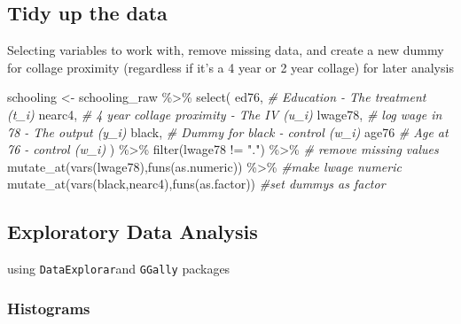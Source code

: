 \documentclass[
]{article}
\newenvironment{Shaded}{\begin{snugshade}}{\end{snugshade}}
\newcommand{\CommentTok}[1]{\textcolor[rgb]{0.56,0.35,0.01}{\textit{#1}}}
\newcommand{\FunctionTok}[1]{\textcolor[rgb]{0.00,0.00,0.00}{#1}}
\newcommand{\NormalTok}[1]{#1}
\newcommand{\OtherTok}[1]{\textcolor[rgb]{0.56,0.35,0.01}{#1}}
\newcommand{\SpecialCharTok}[1]{\textcolor[rgb]{0.00,0.00,0.00}{#1}}
\newcommand{\StringTok}[1]{\textcolor[rgb]{0.31,0.60,0.02}{#1}}
\begin{document}
\hypertarget{tidy-up-the-data}{%
\subsection{Tidy up the data}\label{tidy-up-the-data}}

Selecting variables to work with, remove missing data, and create a new
dummy for collage proximity (regardless if it's a 4 year or 2 year
collage) for later analysis

\begin{Shaded}
\begin{Highlighting}[]
\NormalTok{schooling }\OtherTok{\textless{}{-}}\NormalTok{ schooling\_raw }\SpecialCharTok{\%\textgreater{}\%} 
  \FunctionTok{select}\NormalTok{(}
\NormalTok{    ed76,     }\CommentTok{\# Education {-} The treatment (t\_i)}
\NormalTok{    nearc4,   }\CommentTok{\# 4 year collage proximity {-} The IV (u\_i)  }
\NormalTok{    lwage78,  }\CommentTok{\# log wage in 78 {-} The output (y\_i)}
\NormalTok{    black,    }\CommentTok{\# Dummy for black {-} control (w\_i)}
\NormalTok{    age76     }\CommentTok{\# Age at 76       {-} control (w\_i) }
\NormalTok{    ) }\SpecialCharTok{\%\textgreater{}\%} 
  \FunctionTok{filter}\NormalTok{(lwage78 }\SpecialCharTok{!=} \StringTok{"."}\NormalTok{) }\SpecialCharTok{\%\textgreater{}\%}                      \CommentTok{\# remove missing values}
  \FunctionTok{mutate\_at}\NormalTok{(}\FunctionTok{vars}\NormalTok{(lwage78),}\FunctionTok{funs}\NormalTok{(as.numeric)) }\SpecialCharTok{\%\textgreater{}\%}    \CommentTok{\#make lwage numeric}
  \FunctionTok{mutate\_at}\NormalTok{(}\FunctionTok{vars}\NormalTok{(black,nearc4),}\FunctionTok{funs}\NormalTok{(as.factor)) }\CommentTok{\#set dummys as factor}
\end{Highlighting}
\end{Shaded}

\hypertarget{exploratory-data-analysis}{%
\subsection{Exploratory Data Analysis}\label{exploratory-data-analysis}}

using \texttt{DataExplorar}and \texttt{GGally} packages

\hypertarget{histograms}{%
\subsubsection{Histograms}\label{histograms}}
\end{document}
